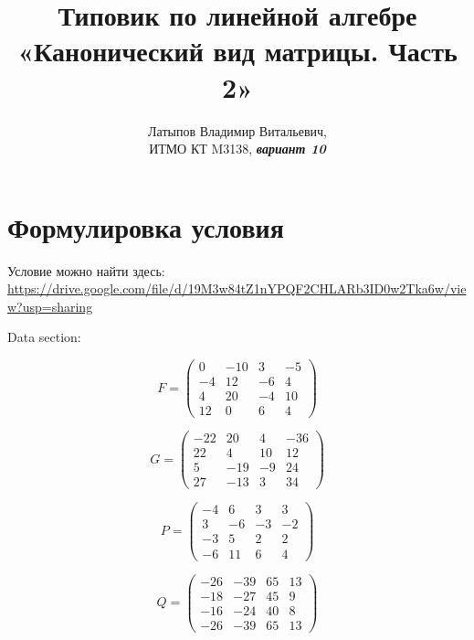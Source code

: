 \documentclass[12pt, a4paper]{article}
\author{Латыпов Владимир Витальевич, \\ ИТМО КТ M3138, \Huge{\textit{\textbf{вариант 10}}}}
\title{Типовик по линейной алгебре «Канонический вид матрицы. Часть 2»}
\begin{document}
    \tit

    \section{Формулировка условия}

    \begin{statement}
        Условие можно найти здесь: \url{https://drive.google.com/file/d/19M3w84tZ1nYPQF2CHLARb3ID0w2Tka6w/view?usp=sharing}

        Data section:

        \begin{equation}
            F = \left(\begin{matrix}
                0 & -10 & 3 & -5 \\
                -4 & 12 & -6 & 4 \\
                4 & 20 & -4 & 10 \\
                12 & 0 & 6 & 4
            \end{matrix}\right)
        \end{equation}

        \begin{equation}
            G = \left(\begin{matrix}
                -22 & 20 & 4 & -36 \\
                22 & 4 & 10 & 12 \\
                5 & -19 & -9 & 24 \\
                27 & -13 & 3 & 34
            \end{matrix}\right)
        \end{equation}

        \begin{equation}
            P = \left(\begin{matrix}
                -4 & 6 & 3 & 3 \\
                3 & -6 & -3 & -2 \\
                -3 & 5 & 2 & 2 \\
                -6 & 11 & 6 & 4
            \end{matrix}\right)
        \end{equation}

        \begin{equation}
            Q = \left(\begin{matrix}
                -26 & -39 & 65 & 13 \\
                -18 & -27 & 45 & 9 \\
                -16 & -24 & 40 & 8 \\
                -26 & -39 & 65 & 13
            \end{matrix}\right)
        \end{equation}


\end{statement}
\end{document}

